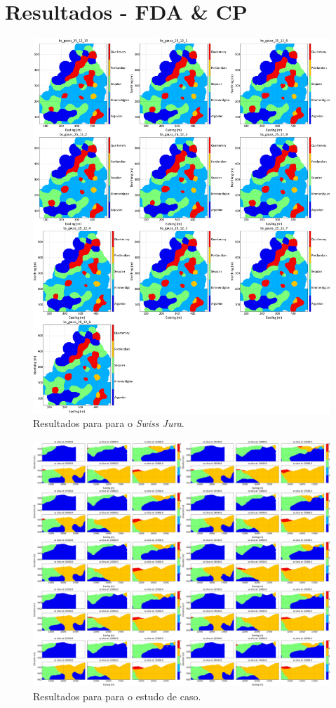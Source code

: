 \chapter{Resultados - FDA \& CP}\label{fda_cp_res}

\begin{figure}[H]
	\caption{Resultados para para o \textit{Swiss Jura}.}
	\centering
		\includegraphics[width=1\textwidth]{apendice_c/sd_pf_jura.png}
\end{figure}

\begin{figure}[H]
	\caption{Resultados para para o estudo de caso.}
	\centering
		\includegraphics[width=1\textwidth]{apendice_c/sdpf_case_study.png}
\end{figure}